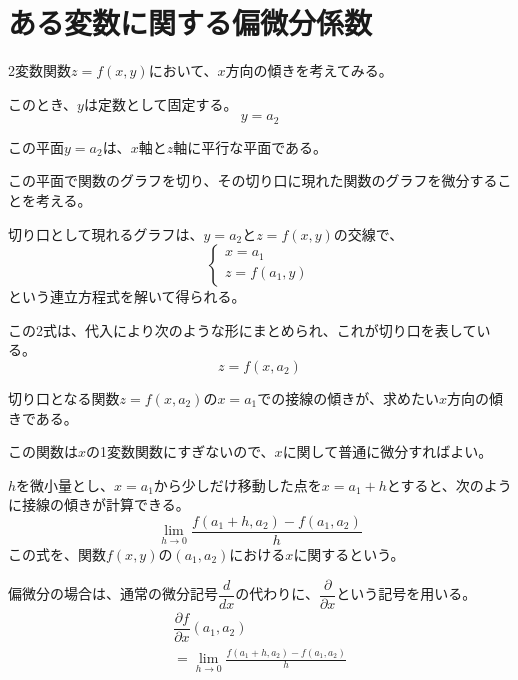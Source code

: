 \documentclass[../../../topic_multivariable-calculus]{subfiles}
\begin{document}
\sectionline
\section{ある変数に関する偏微分係数}

2変数関数$z = f(x, y)$において、$x$方向の傾きを考えてみる。

このとき、$y$は定数として固定する。
\begin{equation*}
  y = a_2
\end{equation*}

この平面$y=a_2$は、$x$軸と$z$軸に平行な平面である。

この平面で関数のグラフを切り、その切り口に現れた関数のグラフを微分することを考える。

\br

切り口として現れるグラフは、$y = a_2$と$z=f(x, y)$の交線で、
\begin{equation*}
  \begin{cases} 
    x = a_1 \\ 
    z = f(a_1, y) 
  \end{cases}
\end{equation*}
という連立方程式を解いて得られる。

\br

この2式は、代入により次のような形にまとめられ、これが切り口を表している。
\begin{equation*}
  z = f(x, a_2)
\end{equation*}

切り口となる関数$z = f(x, a_2)$の$x = a_1$での接線の傾きが、求めたい$x$方向の傾きである。

この関数は$x$の1変数関数にすぎないので、$x$に関して普通に微分すればよい。

\br

$h$を微小量とし、$x = a_1$から少しだけ移動した点を$x = a_1 + h$とすると、次のように接線の傾きが計算できる。
\begin{equation*}
  \lim_{h \to 0} \frac{f(a_1 + h, a_2) - f(a_1, a_2)}{h}
\end{equation*}
この式を、関数$f(x,y)$の$(a_1,a_2)$における$x$に関するという。

\br

偏微分の場合は、通常の微分記号$\dfrac{d}{dx}$の代わりに、$\dfrac{\partial}{\partial x}$という記号を用いる。
\begin{multline*}
  \dfrac{\partial f}{\partial x}(a_1,a_2) \\= \lim_{h \to 0} \frac{f(a_1 + h, a_2) - f(a_1, a_2)}{h}
\end{multline*}
\end{document}

